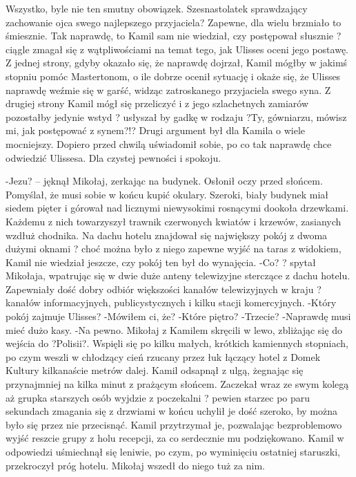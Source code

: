 \documentclass[../MAIN.tex]{subfiles}
\begin{document}
Wszystko, byle nie ten smutny obowiązek.
Szesnastolatek sprawdzający zachowanie ojca swego najlepszego przyjaciela? Zapewne, dla wielu brzmiało to śmiesznie. Tak naprawdę, to Kamil sam nie wiedział, czy postępował słusznie ? ciągle zmagał się z wątpliwościami na temat tego, jak Ulisses oceni jego postawę.
Z jednej strony, gdyby okazało się, że naprawdę dojrzał, Kamil mógłby w jakimś stopniu pomóc Mastertonom, o ile dobrze ocenił sytuację i okaże się, że Ulisses naprawdę weźmie się w garść, widząc zatroskanego przyjaciela swego syna.
Z drugiej strony Kamil mógł się przeliczyć i z jego szlachetnych zamiarów pozostałby jedynie wstyd ? usłyszał by gadkę w rodzaju ?Ty, gówniarzu, mówisz mi, jak postępować z synem?!?
Drugi argument był dla Kamila o wiele mocniejszy. Dopiero przed chwilą uświadomił sobie, po co tak naprawdę chce odwiedzić Ulissesa.
Dla czystej pewności i spokoju.

-Jezu? -- jęknął Mikołaj, zerkając na budynek. Osłonił oczy przed słońcem. Pomyślał, że musi sobie w końcu kupić okulary.
Szeroki, biały budynek miał siedem pięter i górował nad licznymi niewysokimi rosnącymi dookoła drzewkami. Każdemu z nich towarzyszył trawnik czerwonych kwiatów i krzewów, zasianych wzdłuż chodnika.
Na dachu hotelu znajdował się największy pokój z dwoma dużymi oknami ? choć można było z niego zapewne wyjść na taras z widokiem, Kamil nie wiedział jeszcze, czy pokój ten był do wynajęcia.
-Co? ? spytał Mikołaja, wpatrując się w dwie duże anteny telewizyjne sterczące z dachu hotelu. Zapewniały dość dobry odbiór większości kanałów telewizyjnych w kraju ? kanałów informacyjnych, publicystycznych i kilku stacji komercyjnych.
-Który pokój zajmuje Ulisses?
-Mówiłem ci, że?
-Które piętro?
-Trzecie?
-Naprawdę musi mieć dużo kasy.
-Na pewno.
Mikołaj z Kamilem skręcili w lewo, zbliżając się do wejścia do ?Polisii?. Wspięli się po kilku małych, krótkich kamiennych stopniach, po czym weszli w chłodzący cień rzucany przez łuk łączący hotel z Domek Kultury kilkanaście metrów dalej. Kamil odsapnął z ulgą, żegnając się przynajmniej na kilka minut z prażącym słońcem. Zaczekał wraz ze swym kolegą aż grupka starszych osób wyjdzie z poczekalni ? pewien starzec po paru sekundach zmagania się z drzwiami w końcu uchylił je dość szeroko, by można było się przez nie przecisnąć.
Kamil przytrzymał je, pozwalając bezproblemowo wyjść reszcie grupy z holu recepcji, za co serdecznie mu podziękowano. Kamil w odpowiedzi uśmiechnął się leniwie, po czym, po wyminięciu ostatniej staruszki, przekroczył próg hotelu. Mikołaj wszedł do niego tuż za nim.
\end{document}
